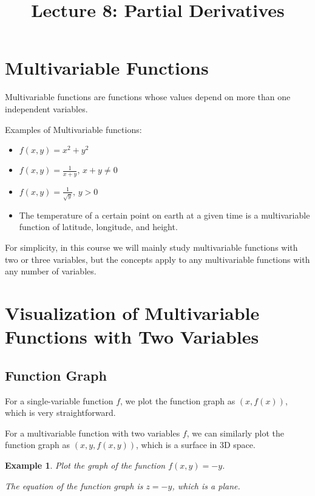 \documentclass{article}
\title{Lecture 8: Partial Derivatives}
\author{}
\date{}
\newtheorem{example}{Example}
\begin{document}
    
\maketitle

\section{Multivariable Functions}

Multivariable functions are functions whose values depend on more than one 
independent variables.

Examples of Multivariable functions:
\begin{itemize}
  \item $f(x, y) = x^2 + y^2$
  \item $f(x, y) = \frac{1}{x + y},\, x + y \neq 0$
  \item $f(x, y) = \frac{1}{\sqrt{y}},\, y > 0$
  \item The temperature of a certain point on earth at a given time is a 
  multivariable function of latitude, longitude, and height.
\end{itemize}

For simplicity, in this course we will mainly study multivariable functions with 
two or three variables, but the concepts apply to any multivariable functions 
with any number of variables.

\section{Visualization of Multivariable Functions with Two Variables}

\subsection{Function Graph}

For a single-variable function $f$, we plot the function graph as $(x, f(x))$, 
which is very straightforward.

For a multivariable function with two variables $f$, we can similarly plot the 
function graph as $(x, y, f(x, y))$, which is a surface in 3D space.

\begin{example}
  Plot the graph of the function $f(x, y) = -y$.

  The equation of the function graph is $z = -y$, which is a plane.
\end{example}
\end{document}
